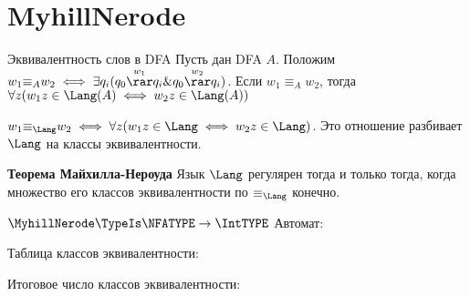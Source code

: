 \section{MyhillNerode}
\begin{frame}{Эквивалентность слов в DFA}
    Пусть дан DFA $A$. Положим $w_1 {\equiv_A} w_2 \iff \exists q_i({q_0}\overset{w_1}{\rar}{q_i} \& {q_0}\overset{w_2}{\rar}{q_i})$.
    Если $w_1 {\equiv_A} w_2$, тогда $\forall z({w_1}z \in \Lang(A) \iff  {w_2}z \in \Lang(A))$

    $w_1 {\equiv_\Lang} w_2 \iff \forall z({w_1}z \in \Lang \iff  {w_2}z \in \Lang)$. Это отношение разбивает $\Lang$ на классы эквивалентности.
    \begin{block}{\bf Теорема Майхилла-Нероуда}
    Язык $\Lang$ регулярен тогда и только тогда, когда множество его классов эквивалентности по ${\equiv_\Lang}$ конечно.   
    \end{block}
\end{frame}
\begin{frame}{$\MyhillNerode\TypeIs\NFATYPE\to\IntTYPE$}
	Автомат:


	Таблица классов эквивалентности:


	Итоговое число классов эквивалентности:

\end{frame}
